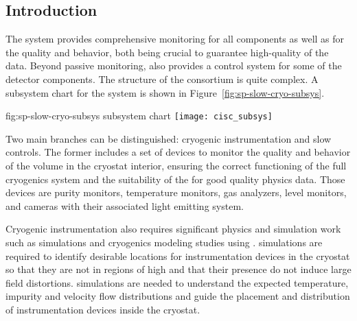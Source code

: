 \subsection{Introduction}
\label{sec:fddp-slow-cryo-intro}



The  system provides 
comprehensive monitoring for all  components as well as for the \lar quality and behavior, both being crucial
to guarantee high-quality of the data. Beyond passive monitoring,  also provides a control system for some of the detector components. 
The structure of the  consortium is quite complex. A subsystem chart
for the  system is shown in Figure~\ref{fig:sp-slow-cryo-subsys}. 

\begin{dunefigure}{fig:sp-slow-cryo-subsys}
{ subsystem chart}
\texttt{[image: cisc\_subsys]}
\end{dunefigure}

Two main branches can be distinguished: cryogenic instrumentation and slow controls. The former includes a set of devices 
to monitor the quality and behavior of the \lar volume in the cryostat interior, ensuring the correct functioning of
the full cryogenics system and the suitability of the  for good quality physics data. Those devices are 
purity monitors, temperature monitors, gas analyzers, \lar level monitors, and cameras with their associated
light emitting system.

Cryogenic instrumentation also requires significant physics and
simulation work such as \efield simulations and cryogenics modeling
studies using . \efield simulations
are required to identify desirable locations for instrumentation
devices in the cryostat so that they are not in regions of high \efield and
that their presence do not induce large field distortions. 
simulations are needed to understand the expected temperature,
impurity and velocity flow distributions and guide the placement and
distribution of instrumentation devices inside the cryostat.


